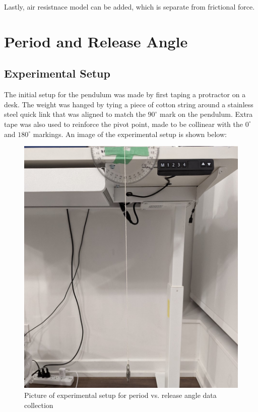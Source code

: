 \documentclass[11pt]{article}
\begin{document}
\begin{multicols}{2}
{\color{blue}
    Lastly, air resistnace model can be added, which is separate from frictional force.
}

\section{Period and Release Angle} \label{sec 3 period and release angle}

\subsection{Experimental Setup}
The initial setup for the pendulum was made by first taping a protractor on a desk. The weight was hanged by tying a piece of cotton string around a stainless steel quick link that was aligned to match the $90^{\circ}$ mark on the pendulum. Extra tape was also used to reinforce the pivot point, made to be collinear with the $0^{\circ}$ and $180^{\circ}$ markings. An image of the experimental setup is shown below:

\begin{figure}[H]
    \centering
    \includegraphics[width=\linewidth]{../figures/exp_setup1.jpg}
    \caption{\centering Picture of experimental setup for period vs. release angle data collection}
    \label{fig:figure 1}
\end{figure}



\end{multicols}
\end{document}
